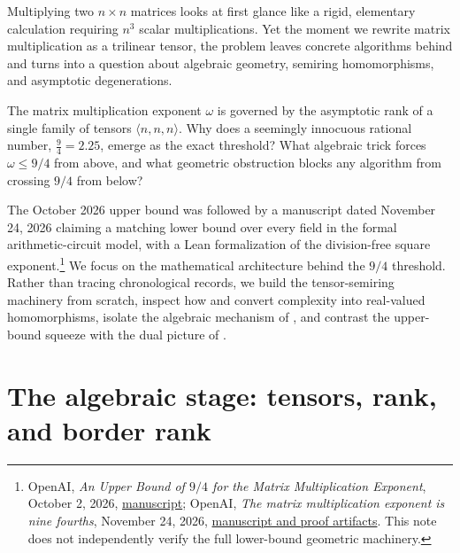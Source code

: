 
Multiplying two \(n \times n\) matrices looks at first glance like a rigid, elementary calculation requiring \(n^3\) scalar multiplications. Yet the moment we rewrite matrix multiplication as a trilinear tensor, the problem leaves concrete algorithms behind and turns into a question about algebraic geometry, semiring homomorphisms, and asymptotic degenerations.

\begin{question}[title={The structural puzzle behind \(\omega = 9/4\)}]
The matrix multiplication exponent \(\omega\) is governed by the asymptotic rank of a single family of tensors \(\langle n, n, n \rangle\). Why does a seemingly innocuous rational number, \(\frac{9}{4} = 2.25\), emerge as the exact threshold? What algebraic trick forces \(\omega \le 9/4\) from above, and what geometric obstruction blocks any algorithm from crossing \(9/4\) from below?
\end{question}

The October 2026 upper bound was followed by a manuscript dated November 24, 2026 claiming a matching lower bound over every field in the formal arithmetic-circuit model, with a Lean formalization of the division-free square exponent.\footnote{OpenAI, \emph{An Upper Bound of \(9/4\) for the Matrix Multiplication Exponent}, October 2, 2026, \href{https://github.com/openai/math/tree/main/preprints/Matrix-Multiplication-Nine-Fourths-October-2-2026}{manuscript}; OpenAI, \emph{The matrix multiplication exponent is nine fourths}, November 24, 2026, \href{https://github.com/openai/math/tree/main/preprints/The-matrix-multiplication-exponent-is-nine-fourths-November-24-2026}{manuscript and proof artifacts}. This note does not independently verify the full lower-bound geometric machinery.} We focus on the mathematical architecture behind the \(9/4\) threshold. Rather than tracing chronological records, we build the tensor-semiring machinery from scratch, inspect how  and  convert complexity into real-valued homomorphisms, isolate the algebraic mechanism of , and contrast the upper-bound squeeze with the dual picture of .

\section{The algebraic stage: tensors, rank, and border rank}

